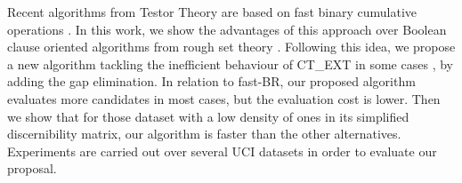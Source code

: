 \documentclass[authoryear,preprint,review,12pt]{elsarticle}
\begin{document}
  Recent algorithms from Testor Theory are based on fast binary cumulative operations \citep{Sanchez10,Lias13}.
  In this work, we show the advantages of this approach over Boolean clause oriented algorithms from rough
  set theory \citep{WangP07,Jensen14}. Following this idea, we propose a new algorithm tackling the inefficient
  behaviour of CT\_EXT in some cases \citep{Alba14}, by adding the gap elimination. In relation to fast-BR, our 
  proposed algorithm evaluates more candidates in most cases, but the evaluation cost is lower. Then we show 
  that for those dataset with a low density of ones in its simplified discernibility matrix, our algorithm is 
  faster than the other alternatives. Experiments are carried out over several UCI datasets \citep{Bache13} in 
  order to evaluate our proposal.
  
  
\end{document}
